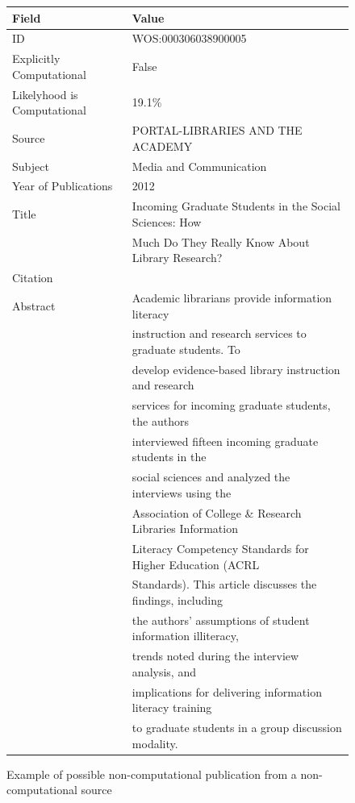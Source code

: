 \documentclass[12pt, a4paper]{article}
\begin{document}
\begin{figure}[ht]
	\begin{tabular}{ll}
		\toprule
		Field & Value\\
		\midrule
		ID & WOS:000306038900005 \\
		Explicitly Computational & False \\
		Likelyhood is Computational & 19.1\% \\
		Source & PORTAL-LIBRARIES AND THE ACADEMY \\
		Subject & Media and Communication\\
		Year of Publications & 2012 \\
		Title &  Incoming Graduate Students in the Social Sciences: How\\
		&Much Do They Really Know About Library Research? \\
		Citation & \cite{monroe2012incoming}\\
		\midrule
		Abstract &  Academic librarians provide information literacy\\
		&instruction and research services to graduate students. To\\
		&develop evidence-based library instruction and research\\
		&services for incoming graduate students, the authors\\
		&interviewed fifteen incoming graduate students in the\\
		&social sciences and analyzed the interviews using the\\
		&Association of College \& Research Libraries Information\\
		&Literacy Competency Standards for Higher Education (ACRL\\
		&Standards). This article discusses the findings, including\\
		&the authors' assumptions of student information illiteracy,\\
		&trends noted during the interview analysis, and\\
		&implications for delivering information literacy training\\
		&to graduate students in a group discussion modality. \\
		\bottomrule
	\end{tabular}
\caption{Example of possible non-computational publication from a non-computational source}\label{sample_not_comp}
\end{figure}
\end{document}
